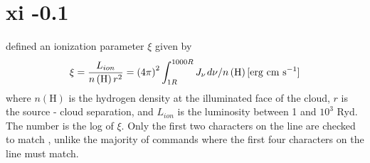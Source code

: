 \section{xi -0.1 }

\citet{Tarter1969} defined an ionization parameter
$\xi$ given by
\begin{equation}
\xi  = \frac{{L_{ion} }}{{n\left( {\mathrm{H}} \right)r^2 }} = \left( {4\pi
} \right)^2 \int_{1R}^{1000R}  J_\nu  {\kern 1pt} d\nu /n\left( {\mathrm{H}}
\right)
 [\mathrm{erg\ cm\ s}^{-1}]%
\end{equation}
where $n(\mathrm{H})$ is the hydrogen density at the illuminated face
of the cloud, $r$ is the source - cloud separation,
and $L_{ion}$ is the luminosity between 1 and $10^3$ Ryd.
The number is the log of $\xi$.
Only the first two characters
on the line are checked to match ,
unlike the majority of commands where
the first four characters on the line must match.
